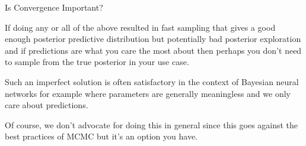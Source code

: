 \begin{frame}{Is Convergence Important?}
    \begin{vfilleditems}
        \item If doing any or all of the above resulted in fast sampling that gives a good enough posterior predictive distribution but potentially bad posterior exploration and if predictions are what you care the most about then perhaps you don't need to sample from the true posterior in your use case.
        \item Such an imperfect solution is often satisfactory in the context of Bayesian neural networks for example where parameters are generally meaningless and we only care about predictions.
        \item Of course, we don't advocate for doing this in general since this goes against the best practices of MCMC but it's an option you have.
    \end{vfilleditems}
\end{frame}
